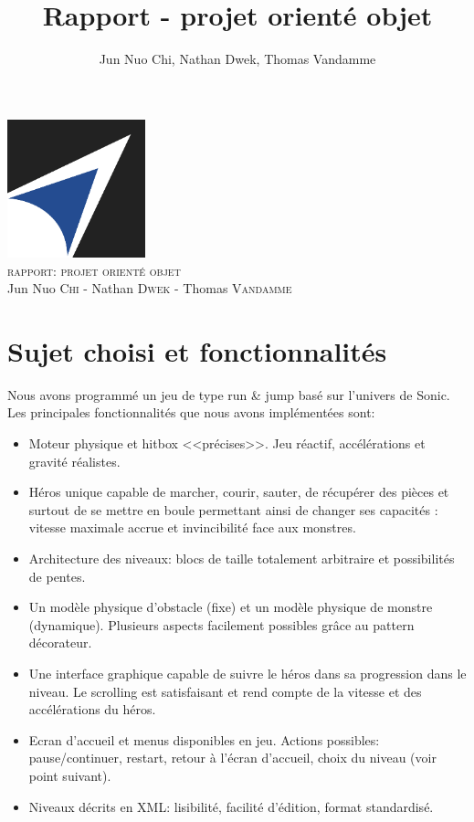 \documentclass[a4paper, 12pt]{article}
\title{Rapport - projet orienté objet}
\author{Jun Nuo Chi, Nathan Dwek, Thomas Vandamme}
\begin{document}
\begin{center}
  \includegraphics[width=0.3\textwidth]{EPB.jpg}~\\[.5cm]

\textsc{\Large rapport: projet orienté objet}\\
Jun Nuo \textsc{Chi} - Nathan \textsc{Dwek} - Thomas \textsc{Vandamme}
\end{center}

\section{Sujet choisi et fonctionnalités}

Nous avons programmé un jeu de type run \& jump basé sur l'univers de Sonic. Les principales fonctionnalités que nous avons implémentées sont:
\begin{itemize}

\item Moteur physique et hitbox <<précises>>. Jeu réactif, accélérations et gravité réalistes.
\item Héros unique capable de marcher, courir, sauter, de récupérer des pièces et surtout de se mettre en boule permettant ainsi de changer ses capacités : vitesse maximale accrue et invincibilité face aux monstres.
\item Architecture des niveaux: blocs de taille totalement arbitraire et possibilités de pentes.
\item Un modèle physique d'obstacle (fixe) et un modèle physique de monstre (dynamique). Plusieurs aspects facilement possibles grâce au pattern décorateur.
\item Une interface graphique capable de suivre le héros dans sa progression dans le niveau. Le scrolling est satisfaisant et rend compte de la vitesse et des accélérations du héros.
\item Ecran d'accueil et menus disponibles en jeu. Actions possibles: pause/continuer, restart, retour à l'écran d'accueil, choix du niveau (voir point suivant).
\item Niveaux décrits en XML: lisibilité, facilité d'édition, format standardisé.

\end{itemize}
\end{document}
